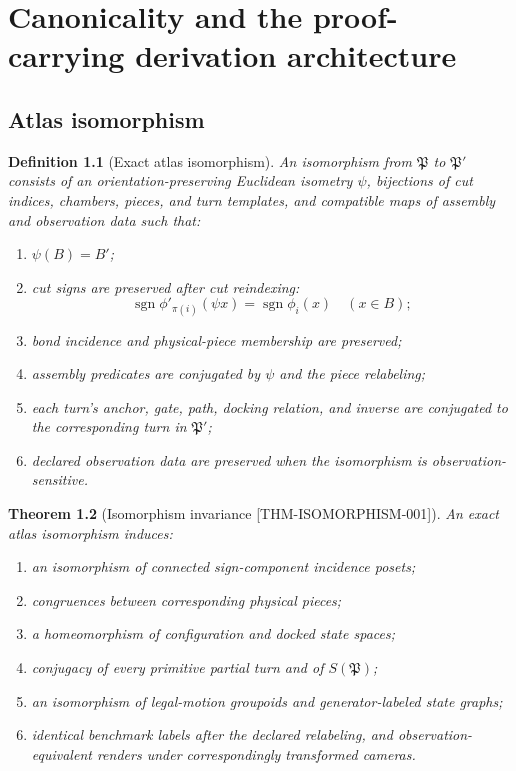 \documentclass[11pt,openany]{book}
\newcommand{\sgn}{\operatorname{sgn}}
\newcommand{\Atlas}{\mathfrak P}
\newcommand{\claimid}[1]{\textnormal{\sffamily\footnotesize[#1]}}
\theoremstyle{polyplain}
\newtheorem{theorem}{Theorem}[chapter]
\theoremstyle{polydef}
\newtheorem{definition}[theorem]{Definition}
\begin{document}
\chapter{Canonicality and the proof-carrying derivation architecture}
\label{chap:canonicality}

\section{Atlas isomorphism}

\begin{definition}[Exact atlas isomorphism]
\label{def:atlas-isomorphism}
An isomorphism from $\Atlas$ to $\Atlas'$ consists of an orientation-preserving Euclidean isometry $\psi$, bijections of cut indices, chambers, pieces, and turn templates, and compatible maps of assembly and observation data such that:
\begin{enumerate}
  \item $\psi(B)=B'$;
  \item cut signs are preserved after cut reindexing:
  \[
  \sgn\phi'_{\pi(i)}(\psi x)=\sgn\phi_i(x)\quad(x\in B);
  \]
  \item bond incidence and physical-piece membership are preserved;
  \item assembly predicates are conjugated by $\psi$ and the piece relabeling;
  \item each turn's anchor, gate, path, docking relation, and inverse are conjugated to the corresponding turn in $\Atlas'$;
  \item declared observation data are preserved when the isomorphism is observation-sensitive.
\end{enumerate}
\end{definition}

\begin{theorem}[Isomorphism invariance \claimid{THM-ISOMORPHISM-001}]
\label{thm:isomorphism-invariance}
An exact atlas isomorphism induces:
\begin{enumerate}
  \item an isomorphism of connected sign-component incidence posets;
  \item congruences between corresponding physical pieces;
  \item a homeomorphism of configuration and docked state spaces;
  \item conjugacy of every primitive partial turn and of $S(\Atlas)$;
  \item an isomorphism of legal-motion groupoids and generator-labeled state graphs;
  \item identical benchmark labels after the declared relabeling, and observation-equivalent renders under correspondingly transformed cameras.
\end{enumerate}
\end{theorem}
\end{document}
